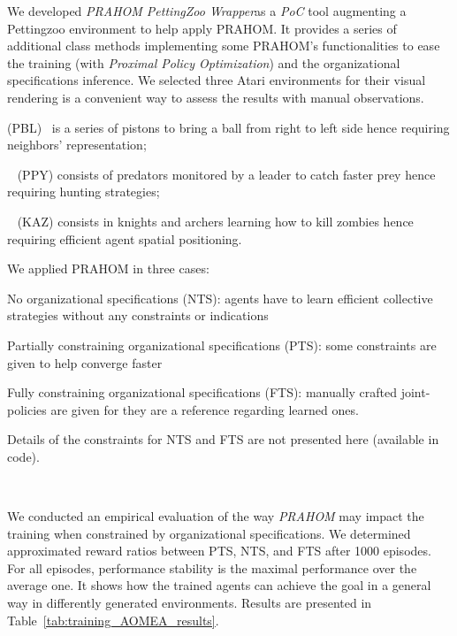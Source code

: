 \documentclass[doubleblind]{ecai}
\begin{document}
We developed \emph{PRAHOM PettingZoo Wrapper}\footnotemark[2] as a \emph{PoC} tool augmenting a Pettingzoo environment to help apply PRAHOM. It provides a series of additional class methods implementing some PRAHOM's functionalities to ease the training (with \emph{Proximal Policy Optimization}) and the organizational specifications inference. We selected three Atari environments for their visual rendering is a convenient way to assess the results with manual observations\footnotemark[1].
%
%
\begin{enumerate*}[label=\roman*),itemjoin={;\quad}]
    \item {} (PBL)~\citep{Terry2021} is a series of pistons to bring a ball from right to left side hence requiring neighbors' representation;
    \item {}~\citep{Lowe2017} (PPY) consists of predators monitored by a leader to catch faster prey hence requiring hunting strategies;
    \item {}~\citep{Terry2021} (KAZ) consists in knights and archers learning how to kill zombies hence requiring efficient agent spatial positioning.
\end{enumerate*}
%
We applied PRAHOM in three cases:
\begin{enumerate*}[label=\roman*),itemjoin={;\quad}]
    \item No organizational specifications (NTS): agents have to learn efficient collective strategies without any constraints or indications
    \item Partially constraining organizational specifications (PTS): some constraints are given to help converge faster
    \item Fully constraining organizational specifications (FTS): manually crafted joint-policies are given for they are a reference regarding learned ones.
\end{enumerate*}
%
Details of the constraints for NTS and FTS are not presented here (available in code\footnotemark[1]).

\

We conducted an empirical evaluation of the way \emph{PRAHOM} may impact the training when constrained by organizational specifications. We determined approximated reward ratios between PTS, NTS, and FTS after 1000 episodes. For all episodes, performance stability is the maximal performance over the average one. It shows how the trained agents can achieve the goal in a general way in differently generated environments. Results are presented in Table~\ref{tab:training_AOMEA_results}.
\end{document}
